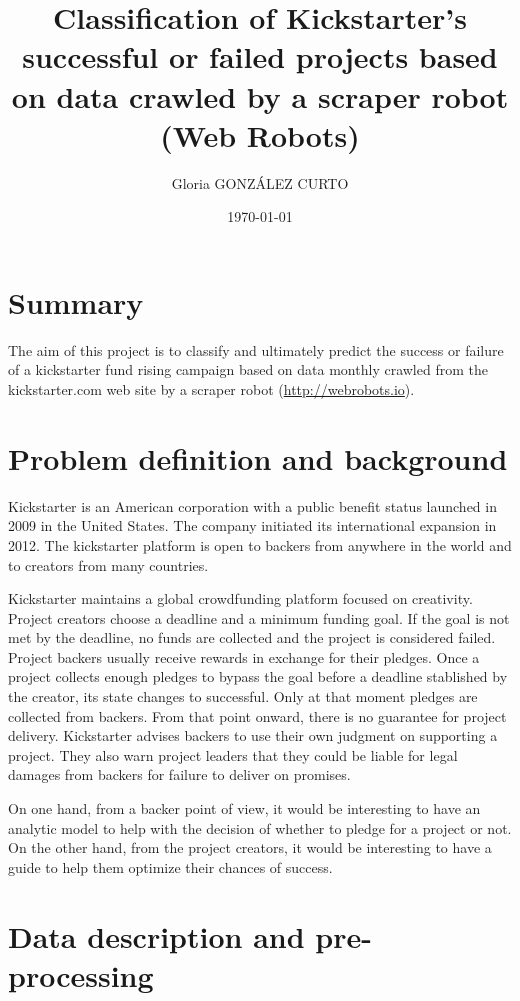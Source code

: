 \documentclass{article}
\title{Classification of Kickstarter's successful or failed projects based on data crawled by a scraper robot (Web Robots)}
\author{Gloria GONZÁLEZ CURTO}
\date{\today}
\begin{document}
\maketitle

\tableofcontents


\section{Summary}
\label{ref:sum}
The aim of this project is to classify and ultimately predict the success or failure of a kickstarter fund rising campaign based on data monthly crawled from the kickstarter.com web site by a scraper robot (\url{http://webrobots.io}).

\section{Problem definition and background}
Kickstarter is an American corporation with a public benefit status launched in 2009 in the United States. The company initiated its international expansion in 2012. The kickstarter platform is open to backers from anywhere in the world and to creators from many countries.

Kickstarter maintains a global crowdfunding platform focused on creativity. Project creators choose a deadline and a minimum funding goal. If the goal is not met by the deadline, no funds are collected and the project is considered failed. Project backers usually receive rewards in exchange for their pledges.
Once a project collects enough pledges to bypass the goal before a deadline stablished by the creator, its state changes to successful. Only at that moment pledges are collected from backers. From that point onward, there is no guarantee for project delivery. Kickstarter advises backers to use their own judgment on supporting a project. They also warn project leaders that they could be liable for legal damages from backers for failure to deliver on promises.
 
On one hand, from a backer point of view, it would be interesting to have an analytic model to help with the decision of whether to pledge for a project or not. On the other hand, from the project creators, it would be interesting to have a guide to help them optimize their chances of success.

\section{Data description and pre-processing}
\label{sec:data_desc}
\end{document}
